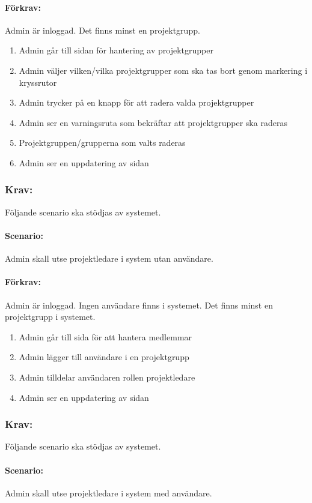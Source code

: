 \documentclass[paper=a4, fontsize=11pt,twoside]{article}
\begin{document}
\paragraph{Förkrav:}
Admin är inloggad. Det finns minst en projektgrupp.
\begin{enumerate}
\item Admin går till sidan för hantering av projektgrupper
\item Admin väljer vilken/vilka projektgrupper som ska tas bort genom markering i kryssrutor
\item Admin trycker på en knapp för att radera valda projektgrupper
\item Admin ser en varningsruta som bekräftar att projektgrupper ska raderas
\item Projektgruppen/grupperna som valts raderas
\item Admin ser en uppdatering av sidan
\end{enumerate}

\subsubsection{Krav:} Följande scenario ska stödjas av systemet. 
\paragraph{Scenario:}
Admin skall utse projektledare i system utan användare.
\paragraph{Förkrav:}
Admin är inloggad. Ingen användare finns i systemet. Det finns minst en projektgrupp i systemet.
\begin{enumerate}
\item Admin går till sida för att hantera medlemmar
\item Admin lägger till användare i en projektgrupp
\item Admin tilldelar användaren rollen projektledare
\item Admin ser en uppdatering av sidan
\end{enumerate}

\subsubsection{Krav:} Följande scenario ska stödjas av systemet. 
\paragraph{Scenario:}
Admin skall utse projektledare i system med användare.
\end{document}
